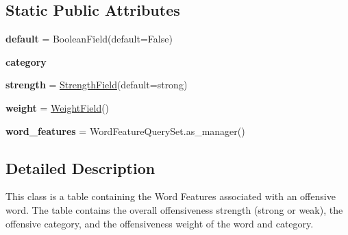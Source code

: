 \subsection*{Static Public Attributes}
\begin{DoxyCompactItemize}
\item 
\mbox{\label{classcapstoneproject_1_1models_1_1models_1_1word__feature_1_1_word_feature_a8ce34f2d65b5696025f77cedf7f2908d}} 
{\bfseries default} = Boolean\+Field(default=False)
\item 
{\bfseries category}
\item 
\mbox{\label{classcapstoneproject_1_1models_1_1models_1_1word__feature_1_1_word_feature_a5d46534cd9f6505be7e3ebad3605ab40}} 
{\bfseries strength} = \mbox{\hyperlink{classcapstoneproject_1_1models_1_1fields_1_1strength__field_1_1_strength_field}{Strength\+Field}}(default=\textquotesingle{}strong\textquotesingle{})
\item 
\mbox{\label{classcapstoneproject_1_1models_1_1models_1_1word__feature_1_1_word_feature_a4fd93b2e0cfa9a3db6216dfccb540829}} 
{\bfseries weight} = \mbox{\hyperlink{classcapstoneproject_1_1models_1_1fields_1_1weight__field_1_1_weight_field}{Weight\+Field}}()
\item 
\mbox{\label{classcapstoneproject_1_1models_1_1models_1_1word__feature_1_1_word_feature_a4b75e8e647a6ee6bd6043eb4d2bd3db7}} 
{\bfseries word\+\_\+features} = Word\+Feature\+Query\+Set.\+as\+\_\+manager()
\end{DoxyCompactItemize}


\subsection{Detailed Description}
\begin{DoxyVerb}This class is a table containing the Word Features associated with an
offensive word. The table contains the overall offensiveness strength
(strong or weak), the offensive category, and the offensiveness weight of
the word and category.
\end{DoxyVerb}
 

